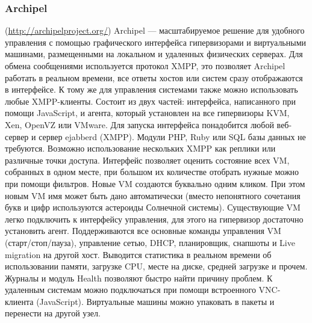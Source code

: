 \subsubsection{Archipel}(\url{http://archipelproject.org/}) Archipel — масштабируемое решение для удобного управления с помощью графического интерфейса гипервизорами и виртуальными машинами, размещенными на локальном и удаленных физических серверах. Для обмена сообщениями используется протокол XMPP, это позволяет Archipel работать в реальном времени, все ответы хостов или систем сразу отображаются в интерфейсе. К тому же для управления системами также можно использовать любые XMPP-клиенты.
Состоит из двух частей: интерфейса, написанного при помощи JavaScript, и агента, который установлен на все гипервизоры KVM, Xen, OpenVZ или VMware. Для запуска интерфейса понадобится любой веб-сервер и сервер ejabberd (XMPP). Модули PHP, Ruby или SQL базы данных не требуются. Возможно использование нескольких XMPP как реплики или различные точки доступа. Интерфейс позволяет оценить состояние всех VM, собранных в одном месте, при большом их количестве отобрать нужные можно при помощи фильтров. Новые VM создаются буквально одним кликом. При этом новым VM имя может быть дано автоматически (вместо непонятного сочетания букв и цифр используются астероиды Солнечной системы). Существующие VM легко подключить к интерфейсу управления, для этого на гипервизор достаточно установить агент. Поддерживаются все основные команды управления VM (старт/стоп/пауза), управление сетью, DHCP, планировщик, снапшоты и Live migration на другой хост. Выводится статистика в реальном времени об использовании памяти, загрузке CPU, месте на диске, средней загрузке и прочем. Журналы и модуль Health позволяют быстро найти причину проблем. К удаленным системам можно подключаться при помощи встроенного VNC-клиента (JavaScript). Виртуальные машины можно упаковать в пакеты и перенести на другой узел.

